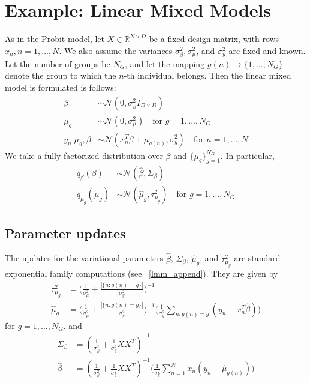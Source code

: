 \documentclass{article}
\begin{document}
\section{Example: Linear Mixed Models} 
As in the Probit model, let $X\in \mathbb{R}^{N\times D}$ be a fixed design matrix, with rows $x_n, n = 1,..., N$. We also assume the variances $\sigma^2_\beta, \sigma^2_\mu$, and $\sigma^2_y$ are fixed and known. Let the number of groups be $N_G$, and let the mapping $g(n)\mapsto \{1, ..., N_G\}$ denote the group to which the $n$-th individual belongs. Then the linear mixed model is formulated is follows: 
\begin{align}
\beta &\sim \mathcal N(0, \sigma^2_\beta I_{D\times D}) \label{eq:lmm_prior1}\\
\mu_g &\sim \mathcal N(0, \sigma^2_\mu) \quad \text{for $g= 1, ..., N_G$} \label{eq:lmm_prior2}\\
y_n | \mu_g, \beta &\sim \mathcal N (x_n^T\beta + \mu_{g(n)}, \sigma^2_y)\quad \text{for $n = 1, ..., N$}\label{eq:lmm_LH}
\end{align}
We take a fully factorized distribution over $\beta$ and $\{\mu_g\}_{g=1}^{N_G}$. In particular, 
\begin{align}
q_\beta(\beta) &\sim \mathcal N (\hat \beta, \Sigma_\beta)\\
q_{\mu_g}(\mu_g) &\sim \mathcal{N}(\hat\mu_g, \tau^2_{\mu_g}) \quad \text{for }g = 1, ..., N_G
\end{align}

\subsection{Parameter updates}
The updates for the variational parameters $\hat\beta$, $\Sigma_\beta$, $\hat\mu_g$, and $\tau^2_{\mu_g}$ are standard exponential family computations (see ~\ref{lmm_append}). They are given by 
\begin{align}
{\tau^2_{\mu_g}} &= \Big(\frac{1}{\sigma^2_\mu} + \frac{|\{n : g(n) = g\}|}{\sigma^2_y}\Big)^{-1}\\
{\hat\mu_g} &= \Big(\frac{1}{\sigma^2_\mu} + \frac{|\{n : g(n) = g\}|}{\sigma^2_y}\Big)^{-1}\Big(\frac{1}{\sigma^2_y}\sum_{n: g(n) = g} (y_n - x_n^T\hat\beta)\Big) \label{eq:lmm_mu_upd}
\end{align}
for $g = 1, ..., N_G$. and 
\begin{align}
\Sigma_\beta &= (\frac{1}{\sigma^2_\beta} + \frac{1}{\sigma^2_y}XX^T)^{-1}\\
\hat\beta &= (\frac{1}{\sigma^2_\beta} + \frac{1}{\sigma^2_y}XX^T)^{-1}\Big(\frac{1}{\sigma^2_y}\sum_{n=1}^N  x_n(y_n - \hat\mu_{g(n)} )\Big)
\end{align}
\end{document}
